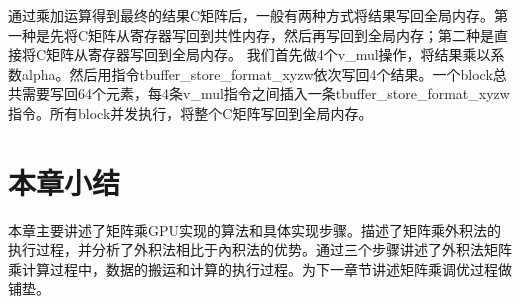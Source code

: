 通过乘加运算得到最终的结果C矩阵后，一般有两种方式将结果写回全局内存。第一种是先将C矩阵从寄存器写回到共性内存，然后再写回到全局内存；第二种是直接将C矩阵从寄存器写回到全局内存。
我们首先做4个v\_mul操作，将结果乘以系数alpha。然后用指令tbuffer\_store\_format\_xyzw依次写回4个结果。一个block总共需要写回64个元素，每4条v\_mul指令之间插入一条tbuffer\_store\_format\_xyzw指令。所有block并发执行，将整个C矩阵写回到全局内存。


\section{本章小结}
本章主要讲述了矩阵乘GPU实现的算法和具体实现步骤。描述了矩阵乘外积法的执行过程，并分析了外积法相比于內积法的优势。通过三个步骤讲述了外积法矩阵乘计算过程中，数据的搬运和计算的执行过程。为下一章节讲述矩阵乘调优过程做铺垫。